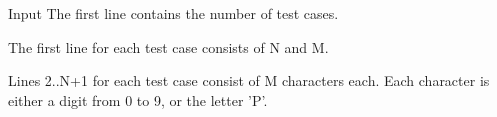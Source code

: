 Input  
The first line contains the number of test cases.  

   The first line for each test case consists of N and M.  

   Lines 2..N+1 for each test case consist of M characters each. Each character is either a digit from 0 to 9, or the letter 'P'.